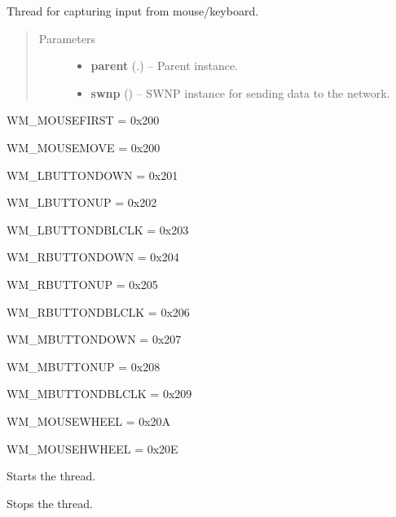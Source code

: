 \documentclass[letterpaper,10pt,english]{sphinxmanual}
\begin{document}
\begin{fulllineitems}
\label{api:wos.INPUT_CAPTURE}
Thread for capturing input from mouse/keyboard.
\begin{quote}\begin{description}
\item[{Parameters}] \leavevmode\begin{itemize}
\item {} 
\textbf{parent} ({\hyperref[api:wos.GUI]{}}.) -- Parent instance.

\item {} 
\textbf{swnp} ({\hyperref[api:swnp.SWNP]{}}) -- SWNP instance for sending data to the network.

\end{itemize}

\end{description}\end{quote}

\begin{fulllineitems}
\label{api:wos.INPUT_CAPTURE.OnMouseEvent}
WM\_MOUSEFIRST = 0x200

WM\_MOUSEMOVE = 0x200

WM\_LBUTTONDOWN = 0x201

WM\_LBUTTONUP = 0x202

WM\_LBUTTONDBLCLK = 0x203

WM\_RBUTTONDOWN = 0x204

WM\_RBUTTONUP = 0x205

WM\_RBUTTONDBLCLK = 0x206

WM\_MBUTTONDOWN = 0x207

WM\_MBUTTONUP = 0x208

WM\_MBUTTONDBLCLK = 0x209

WM\_MOUSEWHEEL = 0x20A

WM\_MOUSEHWHEEL = 0x20E

\end{fulllineitems}


\begin{fulllineitems}
\label{api:wos.INPUT_CAPTURE.run}
Starts the thread.

\end{fulllineitems}


\begin{fulllineitems}
\label{api:wos.INPUT_CAPTURE.stop}
Stops the thread.

\end{fulllineitems}


\end{fulllineitems}
\end{document}
